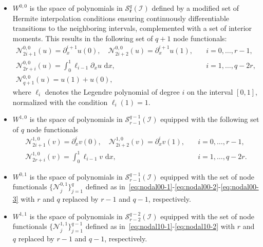 \documentclass[final]{amsart}%
\newcommand{\0}{\mathaccent23}
\newcommand\dx{\,\mathrm{d}x}
\newcommand{\nodal}{\mathcal N}
\newcommand{\interval}{\mathcal I}
\newcommand{\br}{\mathbf r}
\begin{document}
\begin{itemize}
    \item $W^{0,0}$ is the space of polynomials  in $\mathcal{S}^{q}_{\br}(\interval)$ defined by a modified set of Hermite interpolation conditions ensuring continuously differentiable transitions to the neighboring intervals, complemented with a set of interior moments. This results in the following set of $q+1$ node functionals:
    \begin{align}
        \label{eq:nodal00-1}
        \nodal^{0,0}_{2i+1} (u) = \partial_x^{i+1} u(0),\quad
            \nodal^{0,0}_{2i+2} (u) = \partial_x^{i+1} u(1), 
            &\quad i=0,\ldots,r-1,\\
        \label{eq:nodal00-2}    
        \nodal^{0,0}_{2r+i} (u) = \int_0^1 \ell_{i-1} \partial_x u\,\dx,
            &\quad i=1,\dots,q-2r,\\
        \label{eq:nodal00-3}
        \nodal^{0,0}_{q+1}(u) = u(1)+u(0),&    
    \end{align}
where $\ell_i$ denotes the Legendre polynomial of degree $i$ on the interval $[0,1]$, normalized with the condition $\ell_i(1)=1$.

    \item 
    $W^{1,0}$ is the space of polynomials in $\mathcal{S}^{q-1}_{r-1}(\interval)$ equipped with the following set of $q$ node functionals
    \begin{align}
        \label{eq:nodal10-1}
        \nodal^{1,0}_{2i+1} (v) = \partial_x^i v(0), \quad
            \nodal^{1,0}_{2i+2} (v) = \partial_x^i v(1),
            &\quad i=0,\ldots,r-1,\\
        \label{eq:nodal10-2}
        \nodal^{1,0}_{2r+i} (v) = \int_0^1 \ell_{i-1} v\, \dx,
        &\quad i=1,\dots,q-2r.
    \end{align}

    \item 
    $W^{0,1}$ is the space of polynomials in $\mathcal{S}^{q-1}_{r-1}(\interval)$ equipped with the set of node functionals $\{\nodal^{0,1}_j\}_{j=1}^q$ defined as in~\eqref{eq:nodal00-1}-\eqref{eq:nodal00-2}-\eqref{eq:nodal00-3} with $r$ and $q$ replaced by $r-1$ and $q-1$, respectively.

    \item 
    $W^{1,1}$ is the space of polynomials in $\mathcal{S}^{q-2}_{r-2}(\interval)$ equipped with the set of node functionals $\{\nodal^{1,1}_j\}_{j=1}^{q-1}$ defined as in~\eqref{eq:nodal10-1}-\eqref{eq:nodal10-2} with $r$ and $q$ replaced by $r-1$ and $q-1$, respectively.
\end{itemize}
\end{document}
